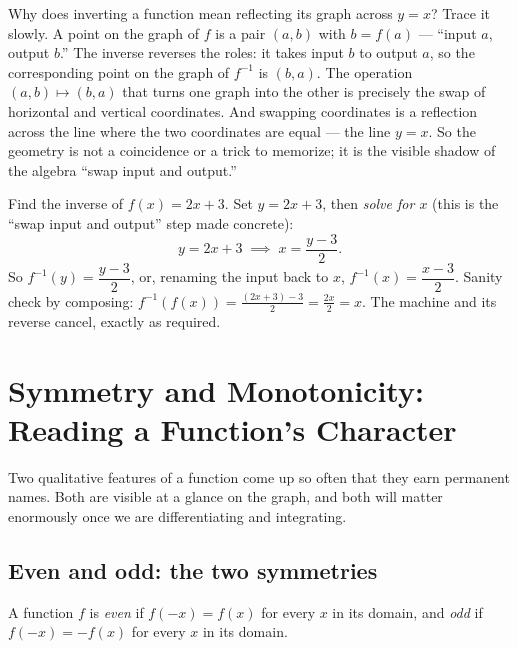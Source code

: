 \begin{whybox}
Why does inverting a function mean reflecting its graph across $y=x$? Trace it
slowly. A point on the graph of $f$ is a pair $(a, b)$ with $b = f(a)$ --- ``input
$a$, output $b$.'' The inverse reverses the roles: it takes input $b$ to output
$a$, so the corresponding point on the graph of $f^{-1}$ is $(b, a)$. The
operation $(a,b) \mapsto (b,a)$ that turns one graph into the other is precisely
the swap of horizontal and vertical coordinates. And swapping coordinates is a
reflection across the line where the two coordinates are equal --- the line $y=x$.
So the geometry is not a coincidence or a trick to memorize; it is the visible
shadow of the algebra ``swap input and output.''
\end{whybox}

\begin{example}
\label{ch02:ex-find-inverse}
Find the inverse of $f(x) = 2x + 3$. Set $y = 2x + 3$, then \emph{solve for $x$}
(this is the ``swap input and output'' step made concrete):
\[
  y = 2x + 3 \;\implies\; x = \frac{y - 3}{2}.
\]
So $f^{-1}(y) = \dfrac{y-3}{2}$, or, renaming the input back to $x$,
$f^{-1}(x) = \dfrac{x-3}{2}$. Sanity check by composing:
$f^{-1}(f(x)) = \frac{(2x+3)-3}{2} = \frac{2x}{2} = x$. The machine and its
reverse cancel, exactly as required.
\end{example}

\section{Symmetry and Monotonicity: Reading a Function's Character}
\label{ch02:symmetry-monotonicity}

Two qualitative features of a function come up so often that they earn permanent
names. Both are visible at a glance on the graph, and both will matter enormously
once we are differentiating and integrating.

\subsection{Even and odd: the two symmetries}

\begin{definition}
\label{ch02:def-even-odd}
A function $f$ is \emph{even} if $f(-x) = f(x)$ for every $x$ in its domain, and
\emph{odd} if $f(-x) = -f(x)$ for every $x$ in its domain.
\end{definition}

